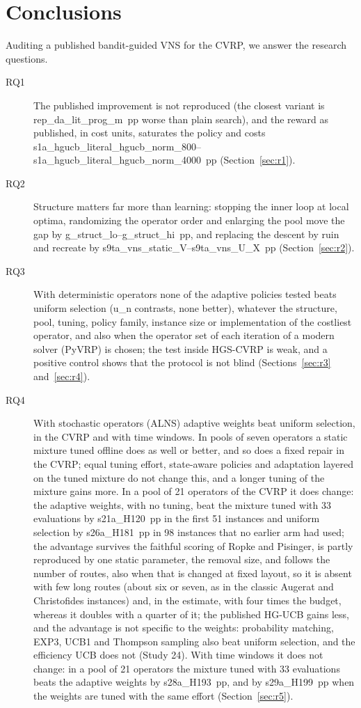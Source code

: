 \section{Conclusions}\label{sec:conclusions}
Auditing a published bandit-guided VNS for the CVRP, we answer the research questions.
\begin{description}
\item[RQ1] The published improvement is not reproduced (the closest variant is \num{rep_da_lit_prog_m}~pp worse than plain search), and the reward as published, in cost units, saturates the policy and costs \num{s1a_hgucb_literal_hgucb_norm_800}--\num{s1a_hgucb_literal_hgucb_norm_4000}~pp (Section~\ref{sec:r1}).
\item[RQ2] Structure matters far more than learning: stopping the inner loop at local optima, randomizing the operator order and enlarging the pool move the gap by \num{g_struct_lo}--\num{g_struct_hi}~pp, and replacing the descent by ruin and recreate by \num{s9ta_vns_static_V}--\num{s9ta_vns_U_X}~pp (Section~\ref{sec:r2}).
\item[RQ3] With deterministic operators none of the adaptive policies tested beats uniform selection (\num{u_n} contrasts, none better), whatever the structure, pool, tuning, policy family, instance size or implementation of the costliest operator, and also when the operator set of each iteration of a modern solver (PyVRP) is chosen; the test inside HGS-CVRP is weak, and a positive control shows that the protocol is not blind (Sections~\ref{sec:r3} and~\ref{sec:r4}).
\item[RQ4] With stochastic operators (ALNS) adaptive weights beat uniform selection, in the CVRP and with time windows. In pools of seven operators a static mixture tuned offline does as well or better, and so does a fixed repair in the CVRP; equal tuning effort, state-aware policies and adaptation layered on the tuned mixture do not change this, and a longer tuning of the mixture gains more. In a pool of 21 operators of the CVRP it does change: the adaptive weights, with no tuning, beat the mixture tuned with 33 evaluations by \num{s21a_H120}~pp in the first 51 instances and uniform selection by \num{s26a_H181}~pp in 98 instances that no earlier arm had used; the advantage survives the faithful scoring of Ropke and Pisinger, is partly reproduced by one static parameter, the removal size, and follows the number of routes, also when that is changed at fixed layout, so it is absent with few long routes (about six or seven, as in the classic Augerat and Christofides instances) and, in the estimate, with four times the budget, whereas it doubles with a quarter of it; the published HG-UCB gains less, and the advantage is not specific to the weights: probability matching, EXP3, UCB1 and Thompson sampling also beat uniform selection, and the efficiency UCB does not (Study 24). With time windows it does not change: in a pool of 21 operators the mixture tuned with 33 evaluations beats the adaptive weights by \num{s28a_H193}~pp, and by \num{s29a_H199}~pp when the weights are tuned with the same effort (Section~\ref{sec:r5}).

\end{description}
